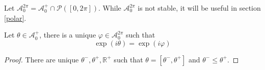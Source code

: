 Let $\mathcal{A}_0^{2\pi} = \mathcal{A}_0^+ \cap \mathcal{P}([0, 2\pi])$. While $\mathcal{A}_0^{2\pi}$ is not stable, it will be useful in section \ref{polar}.

\begin{theorem}
Let $\theta \in \mathcal{A}_0^+$, there is a unique $\varphi \in \mathcal{A}_0^{2\pi}$ such that
$$\exp(i\theta) = \exp(i \varphi)$$
\end{theorem}

\begin{proof}
There are unique $\theta^-, \theta^+, \mathbb{R}^+$ such that $\theta = [\theta^-, \theta^+]$ and $\theta^- \le \theta^+$.

\end{proof}
